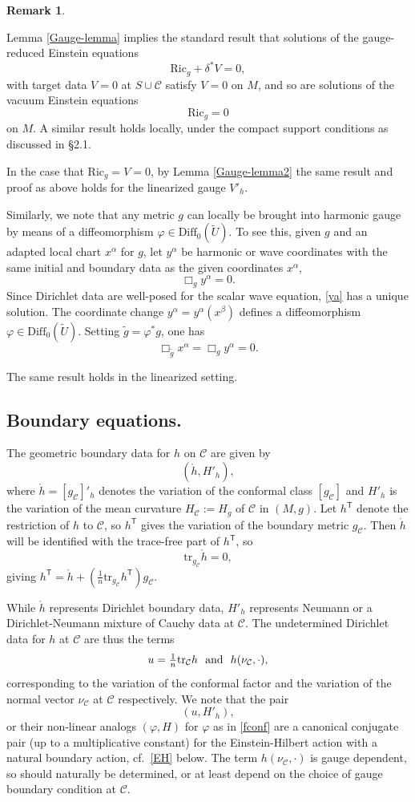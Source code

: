 \documentclass[10pt]{amsart}
\renewcommand{\a}{\alpha}
\renewcommand{\b}{\beta}
\renewcommand{\d}{\delta}
\newcommand{\f}{\varphi}
\newcommand{\cC}{{\mathcal C}}
\newcommand{\Ric}{\mathrm{Ric}}
\newcommand{\Diff}{\mathrm{Diff}}
\newcommand{\tT}{\mathsf{T}}
\newcommand{\be}{\begin{equation}}
\newcommand{\ee}{\end{equation}}
\newcommand{\tr}{\mathrm{tr}}
\newcommand{\<}{\langle}
\renewcommand{\>}{\rangle}
\newcommand{\w}{\widetilde}
\theoremstyle{plain}
\theoremstyle{remark}
\theoremstyle{definition}
\newtheorem{remark}[lemma]{Remark}
\numberwithin{equation}{section}
\begin{document}
\begin{remark}\label{goodg}
{\rm Lemma \ref{Gauge-lemma} implies the standard result that solutions of the gauge-reduced Einstein equations 
$$\Ric_g + \d^*V = 0,$$
with target data $V = 0$ at $S\cup \cC$ satisfy $V = 0$ on $M$, and so are solutions of the vacuum Einstein equations 
$$\Ric_g = 0$$
on $M$. A similar result holds locally, under the compact support conditions as discussed in \S 2.1.  

  In the case that $\Ric_g = V = 0$, by Lemma \ref{Gauge-lemma2} the same result and proof as above holds for the linearized gauge 
  $V'_h$.   
  
  Similarly, we note that any metric $g$ can locally be brought into harmonic gauge by means of a diffeomorphism 
 $\f \in \Diff_0(\w U)$. To see this, given $g$ and an adapted local chart $x^{\a}$ for $g$, let $y^{\a}$ be harmonic or wave coordinates with 
 the same initial and boundary data as the given coordinates $x^{\a}$, 
 \be \label{ya}
 \Box_g y^{\a} = 0.
 \ee
 Since Dirichlet data are well-posed for the scalar wave equation, \eqref{ya} has a unique solution. The coordinate change 
 $y^{\a} = y^{\a}(x^{\b})$ defines a diffeomorphism $\f \in \Diff_0(\w U)$. Setting $\w g = \f^*g$, one has 
 $$\Box_{\w g}x^{\a} = \Box_g y^{\a} = 0.$$
 
   The same result holds in the linearized setting. 

}
\end{remark}


\subsection{Boundary equations.}

   The geometric boundary data for $h$ on $\cC$ are given by 
$$(\ring{h}, H'_h),$$
where $\ring{h} = [g_{\cC}]'_h$ denotes the variation of the conformal class $[g_{\cC}]$ and $H'_h$ is the variation of the mean curvature $H_{\cC} := H_g$ 
of $\cC$ in $(M, g)$. Let $h^{\tT}$ denote the restriction of $h$ to $\cC$, so $h^{\tT}$ gives the variation of the boundary metric $g_{\cC}$. Then $\ring{h}$ 
will be identified with the trace-free part of $h^{\tT}$, so 
$$\tr_{g_{\cC}}\ring{h} = 0,$$
giving $h^{\tT} = \ring{h} + (\frac{1}{n}\tr_{g_{\cC}}h^{\tT}) g_{\cC}$. 

  While $\ring{h}$ represents Dirichlet boundary data, $H'_h$ represents Neumann or a Dirichlet-Neumann mixture of Cauchy data at $\cC$. 
The undetermined Dirichlet data for $h$ at $\cC$ are thus the terms 
\be \label{uh}
u = \tfrac{1}{n}\tr_{\cC}h \ \ {\rm and} \ \ h(\nu_{\cC}, \cdot),
\ee
corresponding to the variation of the conformal factor and the variation of the normal vector $\nu_{\cC}$ at $\cC$ respectively. 
We note that the pair 
\be \label{conj}
(u, H'_h),
\ee
or their non-linear analogs $(\f, H)$ for $\f$ as in \eqref{fconf} are a canonical conjugate pair (up to a multiplicative constant) for the 
Einstein-Hilbert action with a natural boundary action, cf.~\eqref{EH} below. The term $h(\nu_{\cC}, \cdot)$ is gauge dependent, so should 
naturally be determined, or at least depend on the choice of gauge boundary condition at $\cC$. 
\end{document}
